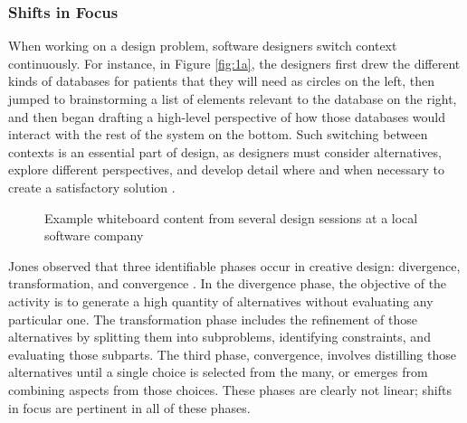 \subsubsection{Shifts in Focus}
\label{behaviorsofsoftwaredesignerswhilesketching:1}

When working on a design problem, software designers switch context continuously. For instance, in Figure \ref{fig:1a}, the designers first drew the different kinds of databases for patients that they will need as circles on the left, then jumped to brainstorming a list of elements relevant to the database on the right, and then began drafting a high-level perspective of how those databases would interact with the rest of the system on the bottom. Such switching between contexts is an essential part of design, as designers must consider alternatives, explore different perspectives, and develop detail where and when necessary to create a satisfactory solution \citep{Petre,Myers,Zannier}.

\begin{figure}
  \centering


 
\caption{Example whiteboard content from several design sessions at a local software company}
\label{fig:1}       %
\end{figure}
%

Jones observed that three identifiable phases occur in creative design: divergence, transformation, and convergence \citep{Jones}. In the divergence phase, the objective of the activity is to generate a high quantity of alternatives without evaluating any particular one. The transformation phase includes the refinement of those alternatives by splitting them into subproblems, identifying constraints, and evaluating those subparts. The third phase, convergence, involves distilling those alternatives until a single choice is selected from the many, or emerges from combining aspects from those choices. These phases are clearly not linear; shifts in focus are pertinent in all of these phases. 

